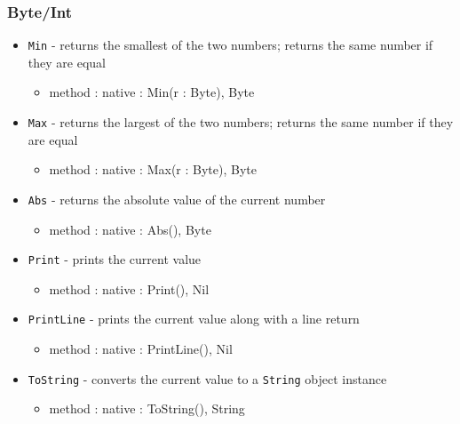 \documentclass[12pt]{article}
\begin{document}
\subsubsection{Byte/Int}
\begin{itemize}
    \item \texttt{Min} - returns the smallest of the two numbers; returns the same number if they are equal
    	\begin{itemize}
	\item method : native : Min(r : Byte), Byte
	\end{itemize}
    \item \texttt{Max} - returns the largest of the two numbers; returns the same number if they are equal
    	\begin{itemize}
	\item method : native : Max(r : Byte), Byte
	\end{itemize}
    \item \texttt{Abs} - returns the absolute value of the current number
    	\begin{itemize}
	\item method : native : Abs(), Byte
	\end{itemize}
    \item \texttt{Print} - prints the current value
    	\begin{itemize}
	\item method : native : Print(), Nil
	\end{itemize}
    \item \texttt{PrintLine} - prints the current value along with a line return
    	\begin{itemize}
	\item method : native : PrintLine(), Nil
	\end{itemize}
    \item \texttt{ToString} - converts the current value to a \texttt{String} object instance
   	\begin{itemize}
	\item method : native : ToString(), String
	\end{itemize}
\end{itemize}
\end{document}
